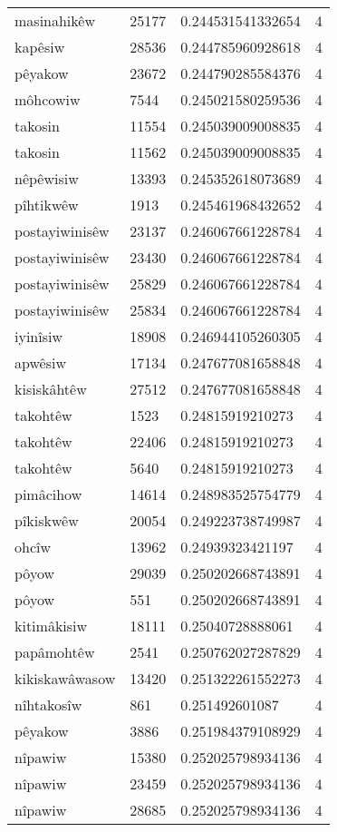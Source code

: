 \begin{longtable}{llll}
masinahikêw & 25177 & 0.244531541332654 & 4 \\
kapêsiw & 28536 & 0.244785960928618 & 4 \\
pêyakow & 23672 & 0.244790285584376 & 4 \\
môhcowiw & 7544 & 0.245021580259536 & 4 \\
takosin & 11554 & 0.245039009008835 & 4 \\
takosin & 11562 & 0.245039009008835 & 4 \\
nêpêwisiw & 13393 & 0.245352618073689 & 4 \\
pîhtikwêw & 1913 & 0.245461968432652 & 4 \\
postayiwinisêw & 23137 & 0.246067661228784 & 4 \\
postayiwinisêw & 23430 & 0.246067661228784 & 4 \\
postayiwinisêw & 25829 & 0.246067661228784 & 4 \\
postayiwinisêw & 25834 & 0.246067661228784 & 4 \\
iyinîsiw & 18908 & 0.246944105260305 & 4 \\
apwêsiw & 17134 & 0.247677081658848 & 4 \\
kisiskâhtêw & 27512 & 0.247677081658848 & 4 \\
takohtêw & 1523 & 0.24815919210273 & 4 \\
takohtêw & 22406 & 0.24815919210273 & 4 \\
takohtêw & 5640 & 0.24815919210273 & 4 \\
pimâcihow & 14614 & 0.248983525754779 & 4 \\
pîkiskwêw & 20054 & 0.249223738749987 & 4 \\
ohcîw & 13962 & 0.24939323421197 & 4 \\
pôyow & 29039 & 0.250202668743891 & 4 \\
pôyow & 551 & 0.250202668743891 & 4 \\
kitimâkisiw & 18111 & 0.25040728888061 & 4 \\
papâmohtêw & 2541 & 0.250762027287829 & 4 \\
kikiskawâwasow & 13420 & 0.251322261552273 & 4 \\
nîhtakosîw & 861 & 0.251492601087 & 4 \\
pêyakow & 3886 & 0.251984379108929 & 4 \\
nîpawiw & 15380 & 0.252025798934136 & 4 \\
nîpawiw & 23459 & 0.252025798934136 & 4 \\
nîpawiw & 28685 & 0.252025798934136 & 4 \\

\end{longtable}
